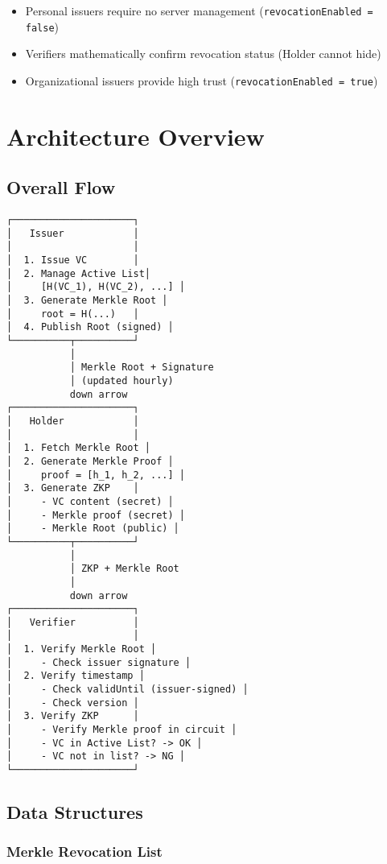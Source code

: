 \begin{itemize}
  \item Personal issuers require no server management (\texttt{revocationEnabled = false})
  \item Verifiers mathematically confirm revocation status (Holder cannot hide)
  \item Organizational issuers provide high trust (\texttt{revocationEnabled = true})
\end{itemize}

\section{Architecture Overview}

\subsection{Overall Flow}

\begin{verbatim}
┌─────────────────────┐
│   Issuer            │
│                     │
│  1. Issue VC        │
│  2. Manage Active List│
│     [H(VC_1), H(VC_2), ...] │
│  3. Generate Merkle Root │
│     root = H(...)   │
│  4. Publish Root (signed) │
└──────────┬──────────┘
           │
           │ Merkle Root + Signature
           │ (updated hourly)
           down arrow
┌─────────────────────┐
│   Holder            │
│                     │
│  1. Fetch Merkle Root │
│  2. Generate Merkle Proof │
│     proof = [h_1, h_2, ...] │
│  3. Generate ZKP    │
│     - VC content (secret) │
│     - Merkle proof (secret) │
│     - Merkle Root (public) │
└──────────┬──────────┘
           │
           │ ZKP + Merkle Root
           │
           down arrow
┌─────────────────────┐
│   Verifier          │
│                     │
│  1. Verify Merkle Root │
│     - Check issuer signature │
│  2. Verify timestamp │
│     - Check validUntil (issuer-signed) │
│     - Check version │
│  3. Verify ZKP      │
│     - Verify Merkle proof in circuit │
│     - VC in Active List? -> OK │
│     - VC not in list? -> NG │
└─────────────────────┘
\end{verbatim}

\subsection{Data Structures}

\subsubsection{Merkle Revocation List}

